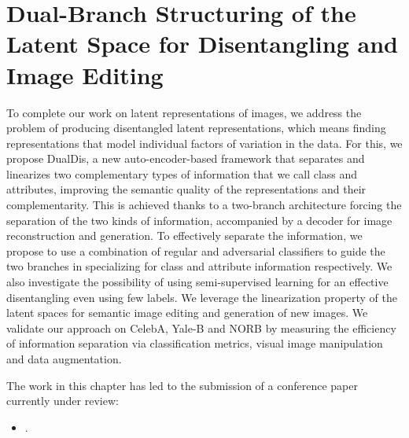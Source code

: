 \chapter{Dual-Branch Structuring of the Latent Space for Disentangling and Image Editing}
\label{chapter:dualdis}

\renewcommand{\leftmark}{\spacedlowsmallcaps{Structuring the Latent Space for Disentangling and Image Editing}}

\begin{chapabstract}
    {\em
    
    To complete our work on latent representations of images, we address the problem of producing disentangled latent representations, which means finding representations that model individual factors of variation in the data.
    For this, we propose DualDis, a new auto-encoder-based framework that separates and linearizes two complementary types of information that we call class and attributes, improving the semantic quality of the representations and their complementarity. This is achieved thanks to a two-branch architecture forcing the separation of the two kinds of information, accompanied by a decoder for image reconstruction and generation. To effectively separate the information, we propose to use a combination of regular and adversarial classifiers to guide the two branches in specializing for class and attribute information respectively. We also investigate the possibility of using semi-supervised learning for an effective disentangling even using few labels. We leverage the linearization property of the latent spaces for semantic image editing and generation of new images. We validate our approach on CelebA, Yale-B and NORB by measuring the efficiency of information separation via classification metrics, visual image manipulation and data augmentation.

    \vspace*{5mm}
    The work in this chapter has led to the submission of a conference paper currently under review:}
    \begin{itemize}
        \item \small {}.
    \end{itemize}
\end{chapabstract}



\newpage

\minitoc
{}


